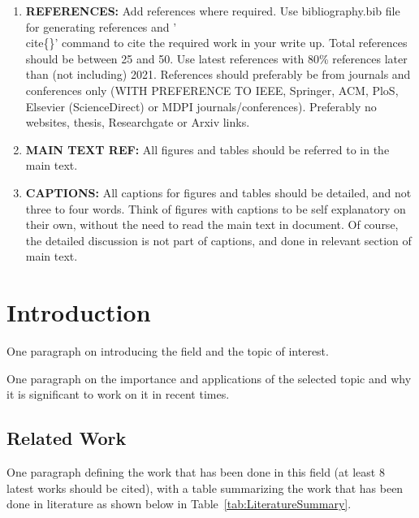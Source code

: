 \documentclass[conference]{IEEEtran}
\begin{document}
{\begin{enumerate}
    \item \textbf{REFERENCES:} Add references where required. Use bibliography.bib file for generating references and '\\cite\{\}' command to cite the required work in your write up. Total references should be between 25 and 50. Use latest references with 80\% references later than (not including) 2021. References should preferably be from journals and conferences only (WITH PREFERENCE TO IEEE, Springer, ACM, PloS, Elsevier (ScienceDirect) or MDPI journals/conferences). Preferably no websites, thesis, Researchgate or Arxiv links.
    \item \textbf{MAIN TEXT REF:} All figures and tables should be referred to in the main text.
    \item \textbf{CAPTIONS:} All captions for figures and tables should be detailed, and not three to four words. Think of figures with captions to be self explanatory on their own, without the need to read the main text in document. Of course, the detailed discussion is not part of captions, and done in relevant section of main text.
\end{enumerate}
}

\section{Introduction}
One paragraph on introducing the field and the topic of interest.

One paragraph on the importance and applications of the selected topic and why it is significant to work on it in recent times.

\subsection{Related Work}
One paragraph defining the work that has been done in this field (at least 8 latest works should be cited), with a table summarizing the work that has been done in literature as shown below in Table~\ref{tab:LiteratureSummary}.
\end{document}
